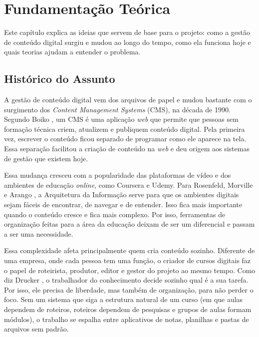 \chapter{Fundamentação Teórica} \label{cha:fundamentacao}

Este capítulo explica as ideias que servem de base para o projeto: como a gestão de conteúdo digital surgiu e mudou ao longo do tempo, como ela funciona hoje e quais teorias ajudam a entender o problema.

\section{Histórico do Assunto}

A gestão de conteúdo digital vem dos arquivos de papel e mudou bastante com o surgimento dos \textit{Content Management Systems} (CMS), na década de 1990. Segundo Boiko \cite{boiko2004}, um CMS é uma aplicação \textit{web} que permite que pessoas sem formação técnica criem, atualizem e publiquem conteúdo digital. Pela primeira vez, escrever o conteúdo ficou separado de programar como ele aparece na tela. Essa separação facilitou a criação de conteúdo na \textit{web} e deu origem aos sistemas de gestão que existem hoje.

Essa mudança cresceu com a popularidade das plataformas de vídeo e dos ambientes de educação \textit{online}, como Coursera e Udemy. Para Rosenfeld, Morville e Arango \cite{rosenfeld2015}, a Arquitetura da Informação serve para que os ambientes digitais sejam fáceis de encontrar, de navegar e de entender. Isso fica mais importante quando o conteúdo cresce e fica mais complexo. Por isso, ferramentas de organização feitas para a área da educação deixam de ser um diferencial e passam a ser uma necessidade.

Essa complexidade afeta principalmente quem cria conteúdo sozinho. Diferente de uma empresa, onde cada pessoa tem uma função, o criador de cursos digitais faz o papel de roteirista, produtor, editor e gestor do projeto ao mesmo tempo. Como diz Drucker \cite{drucker1999}, o trabalhador do conhecimento decide sozinho qual é a sua tarefa. Por isso, ele precisa de liberdade, mas também de organização, para não perder o foco. Sem um sistema que siga a estrutura natural de um curso (em que aulas dependem de roteiros, roteiros dependem de pesquisas e grupos de aulas formam módulos), o trabalho se espalha entre aplicativos de notas, planilhas e pastas de arquivos sem padrão.

